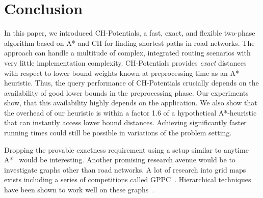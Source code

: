 \documentclass[manuscript,review]{acmart}
\begin{document}
\section{Conclusion}
\label{sec:conclusion}

In this paper, we introduced CH-Potentials, a fast, exact, and flexible two-phase algorithm based on A* and CH for finding shortest paths in road networks.
The approach can handle a multitude of complex, integrated routing scenarios with very little implementation complexity.
CH-Potentials provides \emph{exact} distances with respect to lower bound weights known at preprocessing time as an A* heuristic.
Thus, the query performance of CH-Potentials crucially depends on the availability of good lower bounds in the preprocessing phase.
Our experiments show, that this availability highly depends on the application.
We also show that the overhead of our heuristic is within a factor 1.6 of a hypothetical A*-heuristic that can instantly access lower bound distances.
Achieving significantly faster running times could still be possible in variations of the problem setting.

Dropping the provable exactness requirement using a setup similar to anytime A*~\cite{DBLP:conf/aaai/ZhouH02,DBLP:conf/nips/LikhachevGT03} would be interesting.
Another promising research avenue would be to investigate graphs other than road networks.
A lot of research into grid maps exists including a series of competitions called GPPC~\cite{DBLP:conf/socs/SturtevantTTUKS15}.
Hierarchical techniques have been shown to work well on these graphs~\cite{DBLP:conf/aaai/UrasK14}.




\end{document}
